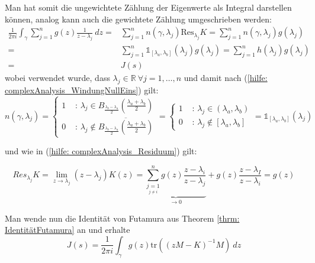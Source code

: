 \documentclass[a4paper,12pt]{report}
\newcommand{\R}{\mathbb R}
\newcommand{\tr}{\text{tr}}
\newcommand{\inv}{^{-1}}
\newcommand{\1}{\mathds{1}}
\newcommand{\Res}{\text{Res}}
\theoremstyle{plain} %
\theoremstyle{definition} %
\theoremstyle{remark}
\begin{document}
            Man hat somit die ungewichtete Zählung der Eigenwerte als Integral darstellen können, analog kann auch die gewichtete Zählung umgeschrieben werden:
            \begin{align*}
                  \frac{1}{2\pi i}\int_\gamma \sum_{j=1}^{n} g(z)\frac{1}{z-\lambda_j} \ dz=& \sum_{j=1}^{n} n(\gamma, \lambda_j) \Res_{\lambda_j}K = \sum_{j=1}^n n(\gamma, \lambda_j) g(\lambda_j)\\
                  =& \sum_{j=1}^{n} \1_{[\lambda_a,\lambda_b]}(\lambda_j) g(\lambda_j) = \sum_{j=1}^{n} h(\lambda_j) g(\lambda_j) \\
                  =& J(s)
            \end{align*}
            wobei verwendet wurde, dass $\lambda_j\in\R\ \forall j=1,\dots,n$ und damit nach (\ref{hilfe: complexAnalysis_WindungNullEins}) gilt:
            $$n(\gamma, \lambda_j) = \begin{cases}
                  1& \text{ : }\lambda_j\in B_\frac{\lambda_b-\lambda_a}{2}(\frac{\lambda_a+\lambda_b}{2})\\
                  0& \text{ : }\lambda_j\notin\overline {B_\frac{\lambda_b-\lambda_a}{2}(\frac{\lambda_a+\lambda_b}{2})}
            \end{cases} = \begin{cases}
                  1& \text{ : }\lambda_j\in (\lambda_a,\lambda_b)\\
                  0& \text{ : }\lambda_j\notin[\lambda_a,\lambda_b]
            \end{cases} = \1_{[\lambda_a,\lambda_b]}(\lambda_j)$$

            und wie in (\ref{hilfe: complexAnalysis_Residuum}) gilt:

            $$Res_{\lambda_j}K = \lim_{z\to\lambda_j} (z-\lambda_j)K(z) = \underbrace{\sum_{\underset{j\ne i}{j=1}}^{n} g(z)\frac{z-\lambda_i}{z-\lambda_j}}_{\to 0} + g(z)\frac{z-\lambda_I}{z-\lambda_i} = g(z)$$

            Man wende nun die Identität von Futamura aus Theorem \ref{thrm: IdentitätFutamura} an und erhalte
            $$J(s) = \frac 1 {2\pi i}\int_\gamma g(z) \tr((zM-K)\inv M)\ dz$$
\end{document}
